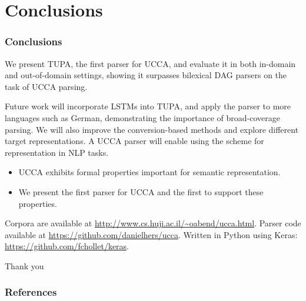 \documentclass[t]{beamer}
\newcommand{\parser}[1]{TUPA\textsubscript{#1}}
\begin{document}
\section{Conclusions}

\begin{frame}
\frametitle{Conclusions}
We present \parser{}, the first parser for UCCA, and
evaluate it in both in-domain and out-of-domain settings,
showing it surpasses bilexical DAG parsers on the task of UCCA parsing.

Future work will incorporate LSTMs into \parser{},
and apply the parser to more languages such as German,
demonstrating the importance of broad-coverage parsing.
We will also improve the conversion-based methods and explore different target representations.
A UCCA parser will enable using the scheme for representation in NLP tasks.

\begin{itemize}
 \item UCCA exhibits formal properties important for semantic representation.
 \item We present the first parser for UCCA and the first to support these properties.
\end{itemize}

Corpora are available at \url{http://www.cs.huji.ac.il/~oabend/ucca.html}.
Parser code available at \url{https://github.com/danielhers/ucca}.
Written in Python using Keras: \url{https://github.com/fchollet/keras}.
\end{frame}

\begin{frame}
\vfill
\begin{center}
Thank you
\end{center}
\end{frame}



\begin{frame}[allowframebreaks]
\frametitle{References}

\tiny
\end{frame}
\end{document}
